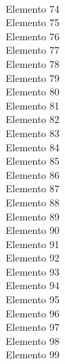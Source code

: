 \documentclass[preview]{standalone}
\begin{document}
\\Elemento 74\\Elemento 75\\Elemento 76\\Elemento 77\\Elemento 78\\Elemento 79\\Elemento 80\\Elemento 81\\Elemento 82\\Elemento 83\\Elemento 84\\Elemento 85\\Elemento 86\\Elemento 87\\Elemento 88\\Elemento 89\\Elemento 90\\Elemento 91\\Elemento 92\\Elemento 93\\Elemento 94\\Elemento 95\\Elemento 96\\Elemento 97\\Elemento 98\\Elemento 99\\
\end{document}
